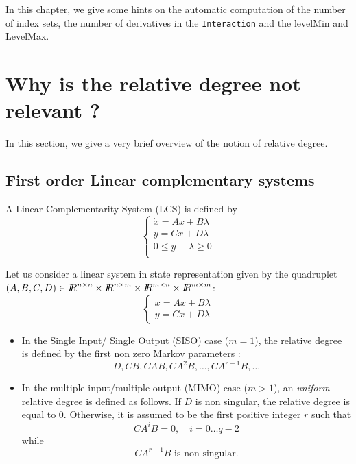 
In this chapter, we give some hints on the automatic computation of the number of index sets, the number of derivatives in the {\tt Interaction} and the levelMin and LevelMax.


\section{Why is the  relative degree not relevant ?}
In this section, we give a very brief overview of the notion of relative degree.

\subsection{First order Linear complementary systems}

 A  Linear Complementarity System (LCS) is defined by
\begin{equation}
  \label{eq:LCS-bis}
  \begin{cases}
    \dot x = A x +B \lambda \\
     y = C x + D \lambda\\
    0 \leq  y \perp \lambda \geq 0 \\
  \end{cases}
\end{equation}
 \begin{definition}
      Let us consider a linear system in state representation given by the quadruplet $(A,B,C,D) \in \RR^{n\times n}\times\RR^{n \times m}\times \RR^{m\times n}\times\RR^{m\times m} $:
      \begin{equation}
        \label{eq:LS}
        \begin{cases}
          \dot x = A x +B \lambda \\
          y = C x + D \lambda
        \end{cases}
      \end{equation}
      \begin{itemize}
      \item In the Single Input/ Single Output (SISO) case ($m=1$), the relative
        degree is defined by the first non zero Markov parameters :
        \begin{equation}
          \label{eq:Markov-Parameter}
          D, CB, CAB, CA^2B, \ldots, CA^{r-1}B, \ldots
        \end{equation}
      \item In the multiple input/multiple output (MIMO) case ($m>1$), an \textit{uniform} relative degree is defined as follows.
        If $D$ is non singular, the relative degree is equal to $0$. Otherwise, it is assumed to be the first positive integer $r$ such that
        \begin{equation}
          \label{eq:mimo-r}
          CA^{i}B =0, \quad i=0\ldots q-2
        \end{equation}
        while
        \begin{equation}
          \label{eq:mimo-r2}
          CA^{r-1}B \text{ is non singular}.
        \end{equation}
      \end{itemize}
    \end{definition}

